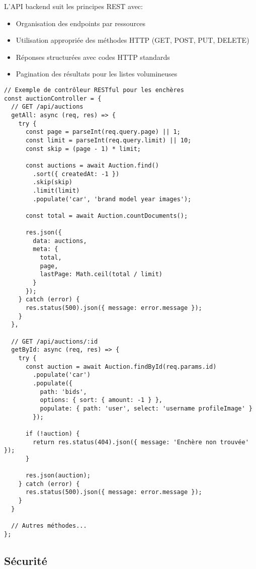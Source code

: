 L'API backend suit les principes REST avec:

\begin{itemize}
    \item Organisation des endpoints par ressources
    \item Utilisation appropriée des méthodes HTTP (GET, POST, PUT, DELETE)
    \item Réponses structurées avec codes HTTP standards
    \item Pagination des résultats pour les listes volumineuses
\end{itemize}

\begin{verbatim}
// Exemple de contrôleur RESTful pour les enchères
const auctionController = {
  // GET /api/auctions
  getAll: async (req, res) => {
    try {
      const page = parseInt(req.query.page) || 1;
      const limit = parseInt(req.query.limit) || 10;
      const skip = (page - 1) * limit;
      
      const auctions = await Auction.find()
        .sort({ createdAt: -1 })
        .skip(skip)
        .limit(limit)
        .populate('car', 'brand model year images');
      
      const total = await Auction.countDocuments();
      
      res.json({
        data: auctions,
        meta: {
          total,
          page,
          lastPage: Math.ceil(total / limit)
        }
      });
    } catch (error) {
      res.status(500).json({ message: error.message });
    }
  },
  
  // GET /api/auctions/:id
  getById: async (req, res) => {
    try {
      const auction = await Auction.findById(req.params.id)
        .populate('car')
        .populate({
          path: 'bids',
          options: { sort: { amount: -1 } },
          populate: { path: 'user', select: 'username profileImage' }
        });
      
      if (!auction) {
        return res.status(404).json({ message: 'Enchère non trouvée' });
      }
      
      res.json(auction);
    } catch (error) {
      res.status(500).json({ message: error.message });
    }
  }
  
  // Autres méthodes...
};
\end{verbatim}

\subsection{Sécurité}

